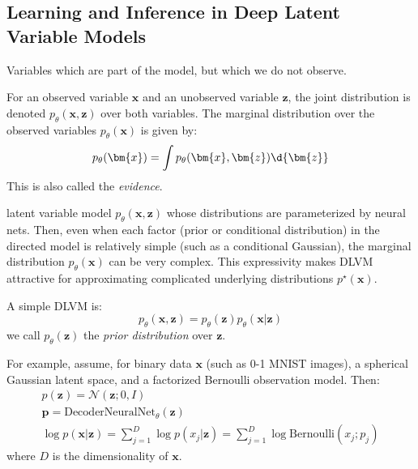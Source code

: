 \documentclass{article}
\begin{document}
\subsection{Learning and Inference in Deep Latent Variable Models}
\begin{definition}  Variables which are part of the model, but which we do not observe.

For an observed variable $\bm{x}$ and an unobserved variable $\bm{z}$, the joint distribution is denoted $p_{\theta}(\bm{x}, \bm{z})$ over both variables. The marginal distribution over the observed variables $p_{\theta}(\bm{x})$ is given by:
  \begin{equation} \label{eq:marginalLikelihood}
  p_{\theta}(\bm{x}) = \int p_{\theta}(\bm{x}, \bm{z}) \d{\bm{z}}
\end{equation}
This is also called the \textit{evidence}.
\end{definition}

\begin{definition}  latent variable model $p_{\theta}(\bm{x}, \bm{z})$ whose distributions are parameterized by neural nets. Then, even when each factor (prior or conditional distribution) in the directed model is relatively simple (such as a conditional Gaussian), the marginal distribution $p_{\theta}(\bm{x})$ can be very complex. This expressivity makes DLVM attractive for approximating complicated underlying distributions $p ^{\star}(\bm{x})$. 
\end{definition}

\begin{example}  A simple DLVM is:
\[
  p_{\theta}(\bm{x}, \bm{z}) = p_{\theta}(\bm{z}) p_{\theta}(\bm{x} | \bm{z}) 
\]
we call $p_{\theta}(\bm{z})$ the \textit{prior distribution} over $\bm{z}$. 

  For example, assume, for binary data $\bm{x}$ (such as 0-1 MNIST images), a spherical Gaussian latent space, and a factorized Bernoulli observation model. Then:
\begin{gather*}
  p (\bm{z}) = \mathcal{N}( \bm{z} ; 0, I) \\
  \bm{p} = \mathrm{DecoderNeuralNet}_{\theta} (\bm{z}) \\
  \log p( \bm{x} | \bm{z}) = \sum_{j=1}^{D} \log  p (x_j | \bm{z}) = \sum_{j=1}^{D} \log \mathrm{Bernoulli}( x_{j} ; p_{j} )
\end{gather*}
where $D$ is the dimensionality of $\bm{x}$. 
\end{example}
\end{document}
